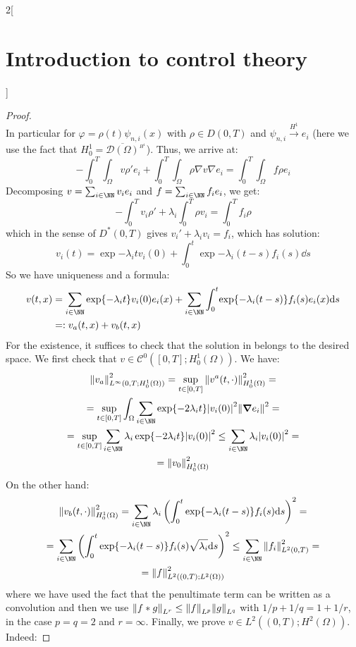 \documentclass[../../../main_math.tex]{subfiles}
\begin{document}
\begin{multicols}{2}[\section{Introduction to control theory}]
\begin{proof}
$$    $$
    In particular for $\varphi = \rho(t)\psi_{n,i}(x)$ with $\rho\in D(0,T)$ and $\psi_{n,i}\overset{H^1}{\to} e_i$ (here we use the fact that $H_0^1=\overline{\mathcal{D}(\Omega)}^{{}_{H^1}}$). Thus, we arrive at:
    $$
      -\int_0^T\int_\Omega v \rho' e_i + \int_0^T\int_\Omega \rho\nabla v \nabla e_i = \int_0^T\int_\Omega f \rho e_i
    $$
    Decomposing $v=\sum_{i\in\NN} v_i e_i$ and $f=\sum_{i\in\NN} f_i e_i$, we get:
    $$
      -\int_0^T v_i \rho' + \lambda_i\int_0^T \rho v_i = \int_0^T f_i \rho
    $$
    which in the sense of $D^*(0,T)$ gives $v_i'+\lambda_i v_i = f_i$, which has solution:
    $$
      v_i(t)=\exp{-\lambda_i t}v_i(0)+\int_0^t\exp{-\lambda_i(t-s)}f_i(s)\dd s
    $$
    So we have uniqueness and a formula:
    \begin{align}\label{ICT:heat_equation_solution}
      v(t,x) & =\sum_{i\in\NN}\exp{-\lambda_i t}v_i(0)e_i(x)+\sum_{i\in\NN}\int_0^t\!\exp{-\lambda_i(t-s)} f_i(s)e_i(x)\dd s \\
             & =:v_a(t,x)+v_b(t,x)\nonumber
    \end{align}
    For the existence, it suffices to check that the solution in  belongs to the desired space. We first check that $v\in \mathcal{C}^0([0,T]; H_0^1(\Omega))$. We have:
    \begin{multline*}
      \norm{v_a}^2_{L^\infty(0,T; H_0^1(\Omega))} = \sup_{t\in[0,T]}\norm{v^a(t,\cdot)}_{H_0^1(\Omega)}^2 =\\=\sup_{t\in[0,T]}\int_\Omega\sum_{i\in\NN}\exp{-2\lambda_i t}\abs{v_i(0)}^2\norm{\grad e_i}^2=\\= \sup_{t\in[0,T]}\sum_{i\in\NN}\lambda_i\exp{-2\lambda_i t}\abs{v_i(0)}^2 \leq \sum_{i\in\NN}\lambda_i\abs{v_i(0)}^2 =\\= \norm{v_0}^2_{H_0^1(\Omega)}
    \end{multline*}
    On the other hand:
    \begin{multline*}
      \norm{v_b(t,\cdot)}^2_{H_0^1(\Omega)} = \sum_{i\in\NN}\lambda_i\left(\int_0^t\exp{-\lambda_i(t-s)}f_i(s)\dd s\right)^2=\\= \sum_{i\in\NN}\left( \int_0^t\exp{-\lambda_i(t-s)}f_i(s)\sqrt{\lambda_i}\dd s\right)^2 \leq \sum_{i\in\NN}\norm{f_i}_{L^2(0,T)}^2 = \\=\norm{f}^2_{L^2((0,T);L^2(\Omega))}
    \end{multline*}
    where we have used the fact that the penultimate term can be written as a convolution and then we use  $\norm{f*g}_{L^r} \leq \norm{f}_{L^p}\norm{g}_{L^q}$ with $1/p+1/q=1+1/r$, in the case $p=q=2$ and $r=\infty$. Finally, we prove $v\in L^2((0,T); H^2(\Omega))$. Indeed:

\end{proof}
\end{multicols}
\end{document}
